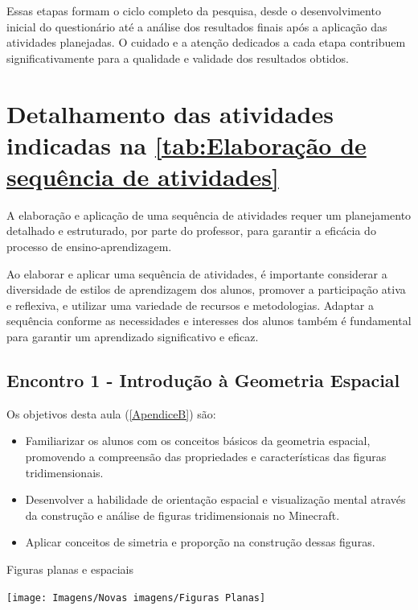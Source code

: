 Essas etapas formam o ciclo completo da pesquisa, desde o desenvolvimento inicial do questionário até a análise dos resultados finais após a aplicação das atividades planejadas. O cuidado e a atenção dedicados a cada etapa contribuem significativamente para a qualidade e validade dos resultados obtidos.

\section{Detalhamento das atividades indicadas na \autoref{tab:Elaboração de sequência de atividades}}

A elaboração e aplicação de uma sequência de atividades requer um planejamento detalhado e estruturado, por parte do professor, para garantir a eficácia do processo de ensino-aprendizagem.

Ao elaborar e aplicar uma sequência de atividades, é importante considerar a diversidade de estilos de aprendizagem dos alunos, promover a participação ativa e reflexiva, e utilizar uma variedade de recursos e metodologias. Adaptar a sequência conforme as necessidades e interesses dos alunos também é fundamental para garantir um aprendizado significativo e eficaz.

\subsection{Encontro 1 - Introdução à Geometria Espacial}

Os objetivos desta aula (\autoref{ApendiceB}) são:

\begin{itemize}
    \item Familiarizar os alunos com os conceitos básicos da geometria espacial, promovendo a compreensão das propriedades e características das figuras tridimensionais.
    \item Desenvolver a habilidade de orientação espacial e visualização mental através da construção e análise de figuras tridimensionais no Minecraft.
    \item Aplicar conceitos de simetria e proporção na construção dessas figuras.
\end{itemize}

\begin{CenteredFigure}
    \caption{Figuras planas e espaciais} \label{fig:00-Figuras planas e espaciais}
    \texttt{[image: Imagens/Novas imagens/Figuras Planas]}
    \legend{\autoria}
\end{CenteredFigure}

